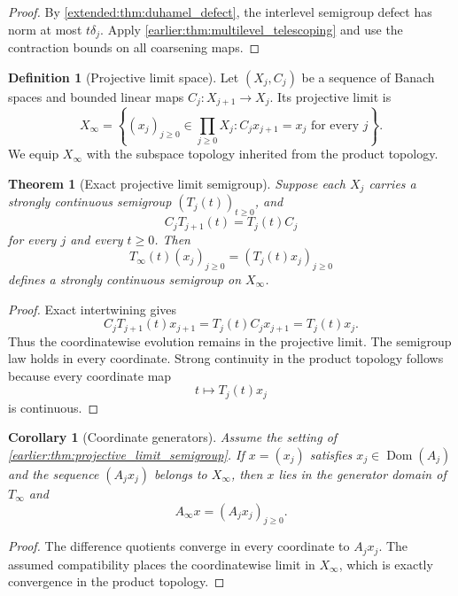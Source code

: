 \documentclass[11pt,letterpaper]{article}
\newtheorem{theorem}{Theorem}[section]
\theoremstyle{plain}
\theoremstyle{plain}
\theoremstyle{plain}
\newtheorem{corollary}[corollary]{Corollary}
\theoremstyle{definition}
\theoremstyle{definition}
\newtheorem{definition}[definition]{Definition}
\theoremstyle{definition}
\theoremstyle{definition}
\theoremstyle{definition}
\theoremstyle{remark}
\theoremstyle{remark}
\theoremstyle{remark}
\theoremstyle{remark}
\theoremstyle{remark}
\theoremstyle{remark}
\begin{document}
\begin{proof}
By \cref{extended:thm:duhamel_defect}, the interlevel semigroup defect has norm at most \(t\delta_j\). Apply \cref{earlier:thm:multilevel_telescoping} and use the contraction bounds on all coarsening maps.
\end{proof}

\begin{definition}[Projective limit space]\label{earlier:record:006}\label{earlier:def:projective_limit}
Let \((X_j,C_j)\) be a sequence of Banach spaces and bounded linear maps \(C_j:X_{j+1}\to X_j\). Its projective limit is
\[
X_\infty
=
\left\{
(x_j)_{j\geq0}\in\prod_{j\geq0}X_j:
C_jx_{j+1}=x_j\text{ for every }j
\right\}.
\]
We equip \(X_\infty\) with the subspace topology inherited from the product topology.
\end{definition}

\begin{theorem}[Exact projective limit semigroup]\label{earlier:record:007}\label{earlier:thm:projective_limit_semigroup}
Suppose each \(X_j\) carries a strongly continuous semigroup \((T_j(t))_{t\geq0}\), and
\[
C_jT_{j+1}(t)=T_j(t)C_j
\]
for every \(j\) and every \(t\geq0\). Then
\[
T_\infty(t)(x_j)_{j\geq0}
=
(T_j(t)x_j)_{j\geq0}
\]
defines a strongly continuous semigroup on \(X_\infty\).
\end{theorem}

\begin{proof}
Exact intertwining gives
\[
C_jT_{j+1}(t)x_{j+1}
=
T_j(t)C_jx_{j+1}
=
T_j(t)x_j.
\]
Thus the coordinatewise evolution remains in the projective limit. The semigroup law holds in every coordinate. Strong continuity in the product topology follows because every coordinate map
\[
t\longmapsto T_j(t)x_j
\]
is continuous.
\end{proof}

\begin{corollary}[Coordinate generators]\label{earlier:record:008}\label{earlier:cor:projective_generators}
Assume the setting of \cref{earlier:thm:projective_limit_semigroup}. If \(x=(x_j)\) satisfies \(x_j\in\operatorname{Dom}(A_j)\) and the sequence \((A_jx_j)\) belongs to \(X_\infty\), then \(x\) lies in the generator domain of \(T_\infty\) and
\[
A_\infty x=(A_jx_j)_{j\geq0}.
\]
\end{corollary}

\begin{proof}
The difference quotients converge in every coordinate to \(A_jx_j\). The assumed compatibility places the coordinatewise limit in \(X_\infty\), which is exactly convergence in the product topology.
\end{proof}
\end{document}
